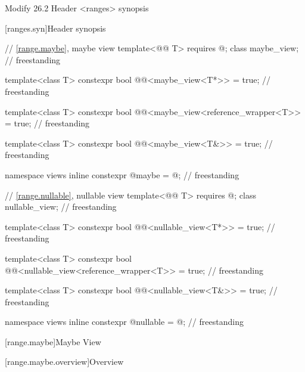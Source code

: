 \documentclass[a4paper,10pt,oneside,openany,final,article]{memoir}
\begin{document}
\begin{wording}


Modify 26.2 Header <ranges> synopsis

[ranges.syn]{Header  synopsis}

\begin{adjustwidth}{1cm}{1cm}
  \begin{addedblock}
    \begin{codeblock}
// \ref{range.maybe}, maybe view
template<@@ T>
requires @\seebelow@;
class maybe_view;                                          // freestanding

template<class T>
constexpr bool
@@<maybe_view<T*>> = true;  // freestanding

template<class T>
constexpr bool
@@<maybe_view<reference_wrapper<T>> = true;  // freestanding

template<class T>
constexpr bool
@@<maybe_view<T&>> = true;  // freestanding

namespace views {
  inline constexpr @\unspec@ maybe = @\unspec@;            // freestanding
}

// \ref{range.nullable}, nullable view
template<@@ T>
requires @\seebelow@;
class nullable_view;                                       // freestanding

template<class T>
constexpr bool
@@<nullable_view<T*>> = true;  // freestanding

template<class T>
constexpr bool
@@<nullable_view<reference_wrapper<T>> = true;  // freestanding

template<class T>
constexpr bool
@@<nullable_view<T&>> = true;  // freestanding

namespace views {
  inline constexpr @\unspec@ nullable = @\unspec@;          // freestanding
}



    \end{codeblock}
  \end{addedblock}
\end{adjustwidth}

[range.maybe]{Maybe View}

[range.maybe.overview]{Overview}


\end{wording}
\end{document}

